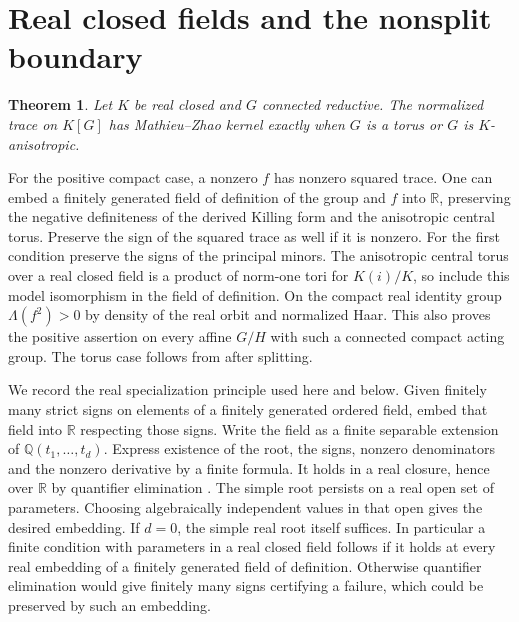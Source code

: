 \documentclass[11pt]{article}
\newtheorem{theorem}{Theorem}[section]
\newcommand{\RR}{\mathbb R}
\newcommand{\QQ}{\mathbb Q}
\begin{document}
\section{Real closed fields and the nonsplit boundary}\label{sec:real}

\begin{theorem}\label{thm:realgroup}
Let \(K\) be real closed and \(G\) connected reductive. The normalized
trace on \(K[G]\) has Mathieu--Zhao kernel exactly when \(G\) is a torus
or \(G\) is \(K\)-anisotropic.
\end{theorem}

For the positive compact case, a nonzero \(f\) has nonzero squared
trace. One can embed a finitely generated field of definition of the
group and \(f\) into \(\RR\), preserving the negative definiteness of
the derived Killing form and the anisotropic central torus. Preserve the sign of the squared
trace as well if it is nonzero. For the first condition preserve the signs of the principal minors. The
anisotropic central torus over a real closed field is a product of
norm-one tori for \(K(i)/K\), so include this model isomorphism in
the field of definition. On the compact real identity group
\(\Lambda(f^2)>0\) by density of the real orbit and normalized Haar.
This also proves the positive assertion on every affine \(G/H\) with
such a connected compact acting group. The torus case follows from
\cite{DvK} after splitting.

We record the real specialization principle used here and below.
Given finitely many strict signs on elements of a finitely generated
ordered field, embed that field into \(\RR\) respecting those signs.
Write the field as a finite separable extension of
\(\QQ(t_1,\ldots,t_d)\). Express existence of the root, the signs,
nonzero denominators and the nonzero derivative by a finite formula.
It holds in a real closure, hence over \(\RR\) by quantifier
elimination \cite{Tarski}. The simple root persists on a real open
set of parameters. Choosing algebraically independent values in
that open gives the desired embedding. If \(d=0\), the simple real
root itself suffices. In particular a finite condition with
parameters in a real closed field follows if it holds at every real
embedding of a finitely generated field of definition. Otherwise
quantifier elimination would give finitely many signs certifying a
failure, which could be preserved by such an embedding.
\end{document}
